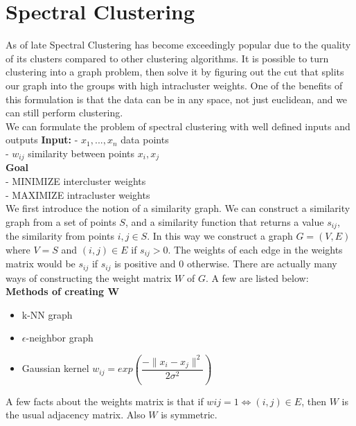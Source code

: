 {\parindent0pt
\section{Spectral Clustering}

As of late Spectral Clustering has become exceedingly popular due to the quality of its clusters compared to other clustering algorithms.   It is possible to turn clustering into a graph problem, then solve it by figuring out the cut that splits our graph into the groups with high intracluster weights. One of the benefits of this formulation is that the data can be in any space, not just euclidean, and we can still perform clustering. \\

We can formulate the problem of spectral clustering with well defined inputs and outputs 
\textbf{Input:} 
- $x_1,...,x_n$ data points\\
- $w_{ij}$ similarity between points $x_i, x_j$ \\

\textbf{Goal}\\
- MINIMIZE intercluster weights\\
- MAXIMIZE intracluster weights\\



We first introduce the notion of a similarity graph. We can construct a similarity graph from a set of points $S$, and a similarity function that returns a value $s_{ij}$, the similarity from points $i, j \in S$. In this way we construct a graph $G = (V,E)$ where $V = S$ and $(i,j) \in E$ if $s_{ij} > 0$.  The weights of each edge in the weights matrix would be $s_{ij}$ if $s_{ij}$ is positive and 0 otherwise. There are actually many ways of constructing the weight matrix $W$ of $G$. A few are listed below:\\

\textbf{Methods of creating W}
\begin{itemize}
	\item k-NN graph
	\item $\epsilon$-neighbor graph
	\item Gaussian kernel $w_{ij} = exp(\dfrac{-\lVert x_i - x_j\rVert ^2}{2 \sigma ^2})$
\end{itemize}

A few facts about the weights matrix is that if $w{ij} = 1 \Longleftrightarrow (i,j) \in E$, then $W$ is the usual adjacency matrix. Also $W$ is symmetric. \\


}
